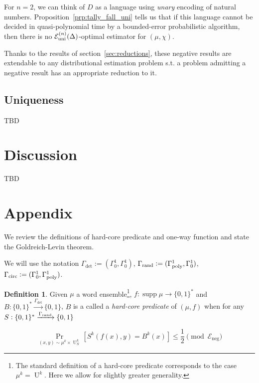 \documentclass{article}
\numberwithin{equation}{section}
\theoremstyle{definition}
\newtheorem{definition}{Definition}[section]
\theoremstyle{plain}
\newcommand{\Bool}{\{0,1\}}
\newcommand{\Words}{{\Bool^*}}
\DeclareMathOperator{\Supp}{supp}
\DeclareMathOperator{\Prb}{Pr}
\DeclareMathOperator{\Un}{U}
\newcommand{\Fall}{\mathcal{E}}
\newcommand{\GammaPoly}{\Gamma_{\textnormal{poly}}}
\newcommand{\FallU}{{\Fall_{\textnormal{uni}}^{(n)}}}
\begin{document}
For ${n=2}$, we can think of ${D}$ as a language using \emph{unary} encoding of natural numbers. Proposition~\ref{prp:tally_fall_uni}  tells us that if this language cannot be decided in quasi-polynomial time by a bounded-error probabilistic algorithm, then there is no ${\FallU(\Delta)}$-optimal estimator for ${(\mu,\chi)}$.

Thanks to the results of section~\ref{sec:reductions}, these negative results are extendable to any distributional estimation problem s.t. a problem admitting a negative result has an appropriate reduction to it.


\subsection{Uniqueness}


TBD

\section{Discussion}
\label{sec:discussion}

TBD


\appendix

\section{Appendix}

We review the definitions of hard-core predicate and one-way function and state the Goldreich-Levin theorem.

We will use the notation $\Gamma_{\text{det}}:=(\Gamma_0^1,\Gamma_0^1)$, $\Gamma_{\text{rand}}:=(\GammaPoly^1,\Gamma_0^1)$, ${\Gamma_{\text{circ}}:=(\Gamma_0^1,\GammaPoly^1)}$.

\begin{samepage}
\begin{definition}

Given $\mu$ a word ensemble\footnote{The standard definition of a hard-core predicate corresponds to the case $\mu^k=\Un^k$. Here we allow for slightly greater generality.}, $f: \Supp \mu \rightarrow \Words$ and ${B: \Words \xrightarrow{\Gamma_{\text{det}}} \Bool}$, $B$ is a called a \emph{hard-core predicate} of $(\mu,f)$ when for any $S: \Words \xrightarrow{\Gamma_{\textnormal{rand}}} \Bool$

\begin{equation}
\Prb_{(x,y) \sim \mu^k \times \Un_S^k}[S^k(f(x),y)=B^k(x)] \leq \frac{1}{2} \pmod {\Fall_{\text{neg}}}
\end{equation}

\end{definition}
\end{samepage}
\end{document}
